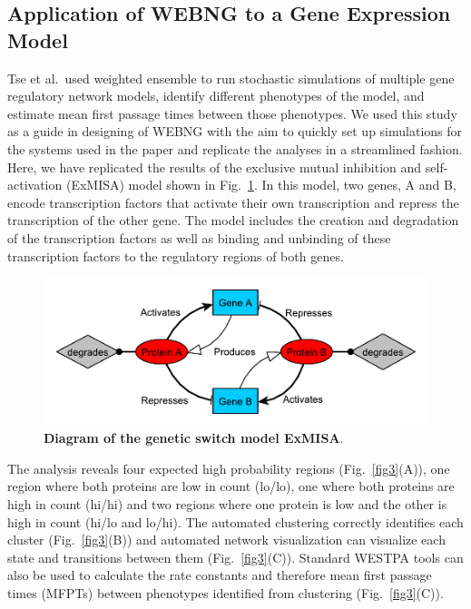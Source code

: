 \documentclass[10pt,letterpaper]{article}
\begin{document}
\subsection*{Application of WEBNG to a Gene Expression Model}

Tse et al.\ used weighted ensemble to run stochastic simulations of multiple gene regulatory network models, identify different phenotypes of the model, and estimate mean first passage times between those phenotypes. We used this study as a guide in designing of WEBNG with the aim to quickly set up simulations for the systems used in the paper and replicate the analyses in a streamlined fashion. Here, we have replicated the results of the exclusive mutual inhibition and self-activation (ExMISA) model shown in Fig.~\ref{fig2}. In this model, two genes, A and B, encode transcription factors that activate their own transcription and repress the transcription of the other gene. The model includes the creation and degradation of the transcription factors as well as binding and unbinding of these transcription factors to the regulatory regions of both genes. 

\begin{figure}[ht] %
\centering
\includegraphics[width=\textwidth]{fig2.pdf}
\caption{\color{Gray} \textbf{Diagram of the genetic switch model ExMISA\cite{TseRead}}.}
\label{fig2} %
\end{figure}


The analysis reveals four expected high probability regions (Fig.~\ref{fig3}(A)), one region where both proteins are low in count (lo/lo), one where both proteins are high in count (hi/hi) and two regions where one protein is low and the other is high in count (hi/lo and lo/hi). The automated clustering correctly identifies each cluster (Fig.~\ref{fig3}(B)) and automated network visualization can visualize each state and transitions between them (Fig.~\ref{fig3}(C)). Standard WESTPA tools can also be used to calculate the rate constants and therefore mean first passage times (MFPTs) between phenotypes identified from clustering (Fig.~\ref{fig3}(C)).
\end{document}
